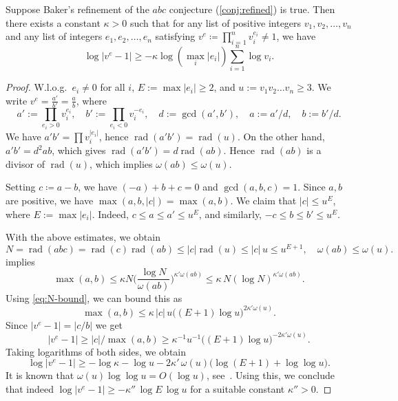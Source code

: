 \documentclass[a4paper,USenglish,cleveref,numberwithinsect]{lipics-v2021}
\DeclareMathOperator{\rad}{rad}
\numberwithin{equation}{section}
\begin{document}
\begin{theorem}
\label{thm:abc-bound}
Suppose Baker's refinement of the $abc$ conjecture (\cref{conj:refined}) is true.
Then there exists a constant $\kappa>0$ such that for any list of positive integers $v_1,v_2,\dots,v_n$
and any list of integers $e_1,e_2,\dots,e_n$ satisfying $v^e\coloneqq\prod_{i=1}^n v_i^{e_i}\neq 1$, we have
\[
 \log|v^e-1| \geq -\kappa \log(\max_i|e_i|)\sum_{i=1}^n \log v_i.
\]
\end{theorem}

\begin{proof}
W.l.o.g.\  $e_i\neq 0$ for all $i$,
$E := \max |e_i| \ge 2$, and $u := v_1v_2\dots v_n \ge 3$.
We write
$v^e= \frac{a'}{b'} = \frac{a}{b}$,
where
\[
   a' := \prod_{e_i> 0} v_i^{e_i}, \quad
   b' := \prod_{e_i<0} v_i^{-e_i} , \quad
 d:= \gcd(a', b'), \quad
 a := a'/d, \quad
b:= b'/d .
\]
We have
$a'b' = \prod v_i^{|e_i|}$, hence
$\rad(a'b') = \rad(u)$.
On the other hand,
$a'b'=d^2 ab$, which gives
$\rad(a'b') = d \rad(ab)$.
Hence $\rad(ab)$ is a divisor of $\rad(u)$,
which implies
$\omega(ab) \le \omega(u)$.

Setting $c\coloneqq a-b$, we have
$(-a)+b+c=0$ and $\gcd(a,b,c)=1$.
Since $a,b$ are positive, we have $\max(a,b,|c|)=\max(a,b)$.
We claim that $|c| \le u^E$,
where $ E := \max |e_i|$.
Indeed,
$c \le a \le a' \le u^E$,
and similarly,
$-c \le b \le b' \le u^E$.

With the above estimates, we obtain
\begin{equation}\label{eq:N-bound}
 N = \rad(abc) = \rad(c) \rad(ab) \le |c| \rad(u) \le |c|\, u \le u^{E +1} , \quad \omega(ab) \le \omega(u) .
\end{equation}
 implies
\[
 \max(a,b)\leq \kappa N \Big(\frac{\log N}{\omega(ab)}\Big)^{\kappa'\omega(ab)}\leq
  \kappa\, N (\log N)^{\kappa'\omega(ab)}.
\]
Using \cref{eq:N-bound},
we can bound this as
\[
 \max(a,b)\leq \kappa\, |c|\, u \big((E+1)\log u \big)^{2\kappa' \omega(u)}.
\]
Since $|v^e-1|=|c/b|$ we get
\[
 |v^e-1|\geq |c|/\max(a,b) \geq  \kappa^{-1} u^{-1} \big((E+1)\log u \big)^{-2\kappa' \omega(u)}.
\]
Taking logarithms of both sides, we obtain
\[
 \log|v^e-1| \geq -\log\kappa -\log u - 2\kappa' \, \omega(u)\big(\log(E+1) + \log \log u \big) .
\]
It is known that $\omega(u)\log\log u = O(\log u)$, see~\cite[\S 22.10]{hardy-wright:08}.
Using this, we conclude that indeed
$\log|v^e-1| \geq -\kappa''\, \log E \, \log u$
for a suitable constant $\kappa''>0$.
\end{proof}
\end{document}
